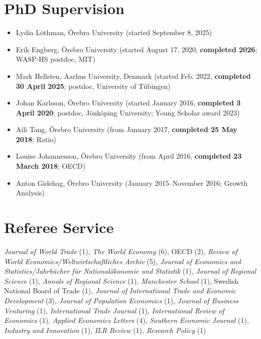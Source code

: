 \documentclass[11pt,a4paper]{article}
\newcommand{\cventry}[1]{\item #1}
\begin{document}
\section{PhD Supervision}

\begin{itemize}
  \cventry{Lydia Löthman, Örebro University (started September 8, 2025)}
  \cventry{Erik Engberg, Örebro University (started August 17, 2020, \textbf{completed 2026}; WASP-HS postdoc, MIT)} %
  \cventry{Mark Hellsten, Aarhus University, Denmark (started Feb. 2022, \textbf{completed 30 April 2025}; postdoc, University of Tübingen)} %
  \cventry{Johan Karlsson, Örebro University (started January 2016, \textbf{completed 3 April 2020}; postdoc, Jönköping University; Young Scholar award 2023)}
  \cventry{Aili Tang, Örebro University (from January 2017, \textbf{completed 25 May 2018}; Ratio)}
  \cventry{Louise Johannesson, Örebro University (from April 2016, \textbf{completed 23 March 2018}; OECD)}
  \cventry{Anton Gidehag, Örebro University (January 2015--November 2016; Growth Analysis)}
\end{itemize}

\section{Referee Service}

\textit{Journal of World Trade} (1), \textit{The World Economy} (6), OECD (2), \textit{Review of World Economics/Weltwirtschaftliches Archiv} (5), \textit{Journal of Economics and Statistics/Jahrbücher für Nationalökonomie und Statistik} (1), \textit{Journal of Regional Science} (1), \textit{Annals of Regional Science} (1), \textit{Manchester School} (1), Swedish National Board of Trade (1), \textit{Journal of International Trade and Economic Development} (3), \textit{Journal of Population Economics} (1), \textit{Journal of Business Venturing} (1), \textit{International Trade Journal} (1), \textit{International Review of Economics} (1), \textit{Applied Economics Letters} (4), \textit{Southern Economic Journal} (1), \textit{Industry and Innovation} (1), \textit{ILR Review} (1), \textit{Research Policy} (1)
\end{document}
